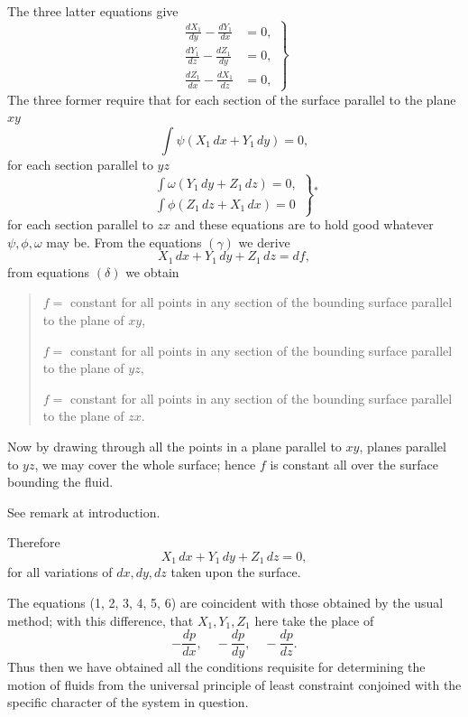 \documentclass[11pt]{article}
\newcommand{\sourcepage}[1]{\marginpar{\scriptsize p.~#1}}
\newcommand{\tagtext}[1]{\tag{#1}}
\begin{document}
The three latter equations give
\begin{equation}
\left.
\begin{aligned}
\frac{dX_1}{dy}-\frac{dY_1}{dx}&=0,\\
\frac{dY_1}{dz}-\frac{dZ_1}{dy}&=0,\\
\frac{dZ_1}{dx}-\frac{dX_1}{dz}&=0,
\end{aligned}
\right\}\tagtext{$\gamma$}
\end{equation}
The three former require that for each section of the surface parallel to the plane $xy$
\[
\int \psi(X_1\,dx+Y_1\,dy)=0,
\]
for each section parallel to $yz$
\begin{equation}
\left.
\begin{gathered}
\int \omega(Y_1\,dy+Z_1\,dz)=0,\\[0.4em]
\int \phi(Z_1\,dz+X_1\,dx)=0
\end{gathered}
\right\}\tagtext{$\delta$}\!^{*}
\end{equation}
for each section parallel to $zx$ and these equations are to hold good whatever $\psi,\phi,\omega$ may be. From the equations $(\gamma)$ we derive
\begin{equation}
X_1\,dx+Y_1\,dy+Z_1\,dz=df, \tag{5}
\end{equation}
from equations $(\delta)$ we obtain
\begin{quote}
$f=$ constant for all points in any section of the bounding surface parallel to the plane of $xy$,\par
$f=$ constant for all points in any section of the bounding surface parallel to the plane of $yz$,\par
$f=$ constant for all points in any section of the bounding surface parallel to the plane of $zx$.
\end{quote}
Now by drawing through all the points in a plane parallel to $xy$, planes parallel to $yz$, we may cover the whole surface; hence $f$ is constant all over the surface bounding the fluid.
\begin{center}\footnotesize * See remark at introduction.\end{center}

\sourcepage{32}
Therefore
\begin{equation}
X_1\,dx+Y_1\,dy+Z_1\,dz=0, \tag{6}
\end{equation}
for all variations of $dx,dy,dz$ taken upon the surface.

The equations (1, 2, 3, 4, 5, 6) are coincident with those obtained by the usual method; with this difference, that $X_1,Y_1,Z_1$ here take the place of
\[
-\frac{dp}{dx},\quad -\frac{dp}{dy},\quad -\frac{dp}{dz}.
\]
Thus then we have obtained all the conditions requisite for determining the motion of fluids from the universal principle of least constraint conjoined with the specific character of the system in question.
\end{document}
